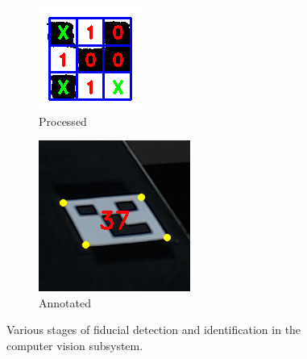 \begin{figure}[!ht]
	\begin{subfigure}{.24\textwidth}
		\centering
		\includegraphics[width=0.8\linewidth]{figures/fiducial-step3}
		\caption{Processed}
		\label{fig:fiducial-step3}
	\end{subfigure}
	\begin{subfigure}{.24\textwidth}
		\centering
		\includegraphics[width=0.8\linewidth]{figures/fiducial-step4}
		\caption{Annotated}
		\label{fig:fiducial-step4}
	\end{subfigure}
	\caption{Various stages of fiducial detection and identification in the computer vision subsystem.}
	\label{fig:fiducial-stages}
\end{figure}


